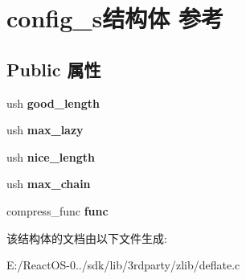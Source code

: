 \hypertarget{structconfig__s}{}\section{config\+\_\+s结构体 参考}
\label{structconfig__s}
\subsection*{Public 属性}
\begin{DoxyCompactItemize}
\item 
\mbox{\label{structconfig__s_a36152319fbe49bebbc0354f8bcb617a6}} 
ush {\bfseries good\+\_\+length}
\item 
\mbox{\label{structconfig__s_afecf50eeeb2afca11ab28d344280231b}} 
ush {\bfseries max\+\_\+lazy}
\item 
\mbox{\label{structconfig__s_af2a1e023e10d6e0c9ff64f8c0c4c9894}} 
ush {\bfseries nice\+\_\+length}
\item 
\mbox{\label{structconfig__s_ac0ef64600cf4487e3754a21934ffdb89}} 
ush {\bfseries max\+\_\+chain}
\item 
\mbox{\label{structconfig__s_aea5a0fe31d694079966523a49d60174b}} 
compress\+\_\+func {\bfseries func}
\end{DoxyCompactItemize}


该结构体的文档由以下文件生成\+:\begin{DoxyCompactItemize}
\item 
E\+:/\+React\+O\+S-\/0../sdk/lib/3rdparty/zlib/deflate.\+c\end{DoxyCompactItemize}
